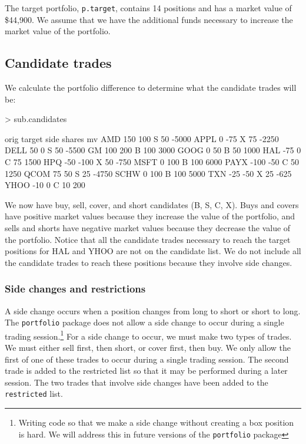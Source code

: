 \documentclass{article}
\begin{document}
The target portfolio, \texttt{p.target}, contains
14 positions and has a market value of
\$44,900.  We assume that we have the
additional funds necessary to increase the market value of the
portfolio.

\subsection{Candidate trades}

We calculate the portfolio difference to determine what the candidate
trades will be:


\begin{Schunk}
\begin{Sinput}
> sub.candidates
\end{Sinput}
\begin{Soutput}
     orig target side shares    mv
AMD   150    100    S     50 -5000
APPL    0    -75    X     75 -2250
DELL   50      0    S     50 -5500
GM    100    200    B    100  3000
GOOG    0     50    B     50  1000
HAL   -75      0    C     75  1500
HPQ   -50   -100    X     50  -750
MSFT    0    100    B    100  6000
PAYX -100    -50    C     50  1250
QCOM   75     50    S     25 -4750
SCHW    0    100    B    100  5000
TXN   -25    -50    X     25  -625
YHOO  -10      0    C     10   200
\end{Soutput}
\end{Schunk}

We now have buy, sell, cover, and short candidates (B, S, C, X).
Buys and covers have positive market values because they increase the
value of the portfolio, and sells and shorts have negative market
values because they decrease the value of the portfolio.  Notice that
all the candidate trades necessary to reach the target positions for
HAL and YHOO are not on the candidate list.  We do not include all the
candidate trades to reach these positions because they involve side
changes.

\subsubsection{Side changes and restrictions}

A side change occurs when a position changes from long to short or
short to long.  The \texttt{portfolio} package does not allow a side
change to occur during a single trading session.\footnote{Writing code
so that we make a side change without creating a box position is hard.
We will address this in future versions of the \texttt{portfolio}
package} For a side change to occur, we must make two types of trades.
We must either sell first, then short, or cover first, then buy.  We
only allow the first of one of these trades to occur during a single
trading session.  The second trade is added to the restricted list so
that it may be performed during a later session.  The two trades that
involve side changes have been added to the \texttt{restricted} list.
\end{document}
